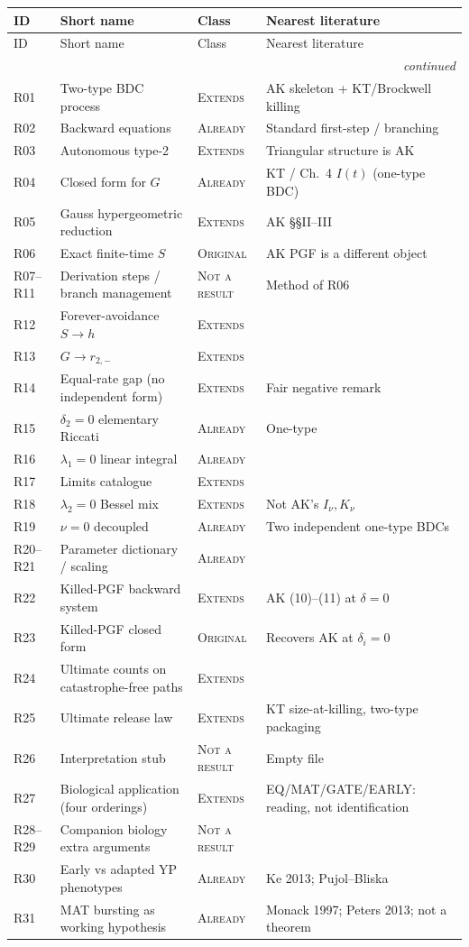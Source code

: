 \documentclass[11pt,a4paper]{report}
\newcommand{\cls}[1]{\textsc{#1}}
\newcommand{\orig}{\cls{Original}}
\newcommand{\ext}{\cls{Extends}}
\newcommand{\alr}{\cls{Already}}
\newcommand{\nar}{\cls{Not a result}}
\newcommand{\itemhead}{%
  \toprule
  ID & Short name & Class & Nearest literature \\
  \midrule
  \endfirsthead
  \toprule
  ID & Short name & Class & Nearest literature \\
  \midrule
  \endhead
  \midrule
  \multicolumn{4}{r}{\footnotesize\itshape continued} \\
  \endfoot
  \bottomrule
  \endlastfoot
}
\newcommand{\itemtable}{\begin{longtable}{L{1.55cm}L{4.35cm}L{2.35cm}L{6.55cm}}}
\begin{document}
\itemtable
\itemhead
R01 & Two-type BDC process & \ext & AK skeleton + KT/Brockwell killing \\
R02 & Backward equations & \alr & Standard first-step / branching \\
R03 & Autonomous type-2 & \ext & Triangular structure is AK \\
R04 & Closed form for \(G\) & \alr & KT / Ch.~4 \(I(t)\) (one-type BDC) \\
R05 & Gauss hypergeometric reduction & \ext & AK §§II--III \\
R06 & Exact finite-time \(S\) & \orig & AK PGF is a different object \\
R07--R11 & Derivation steps / branch management & \nar & Method of R06 \\
R12 & Forever-avoidance \(S\to h\) & \ext & \\
R13 & \(G\to r_{2,-}\) & \ext & \\
R14 & Equal-rate gap (no independent form) & \ext & Fair negative remark \\
R15 & \(\delta_2=0\) elementary Riccati & \alr & One-type \\
R16 & \(\lambda_1=0\) linear integral & \alr & \\
R17 & Limits catalogue & \ext & \\
R18 & \(\lambda_2=0\) Bessel mix & \ext & Not AK's \(I_\nu,K_\nu\) \\
R19 & \(\nu=0\) decoupled & \alr & Two independent one-type BDCs \\
R20--R21 & Parameter dictionary / scaling & \alr & \\
R22 & Killed-PGF backward system & \ext & AK (10)--(11) at \(\delta=0\) \\
R23 & Killed-PGF closed form & \orig & Recovers AK at \(\delta_i=0\) \\
R24 & Ultimate counts on catastrophe-free paths & \ext & \\
R25 & Ultimate release law & \ext &
KT size-at-killing, two-type packaging \\
R26 & Interpretation stub & \nar & Empty file \\
R27 & Biological application (four orderings) & \ext &
EQ/MAT/GATE/EARLY: reading, not identification \\
R28--R29 & Companion biology extra arguments & \nar & \\
R30 & Early vs adapted YP phenotypes & \alr & Ke 2013; Pujol--Bliska \\
R31 & MAT bursting as working hypothesis & \alr &
Monack 1997; Peters 2013; not a theorem \\
\end{longtable}
\end{document}
